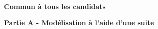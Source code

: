 
\textbf{Commun à tous les candidats}

\medskip

%
%

\textbf{Partie A - Modélisation à l'aide d'une suite}

\medskip


\medskip

